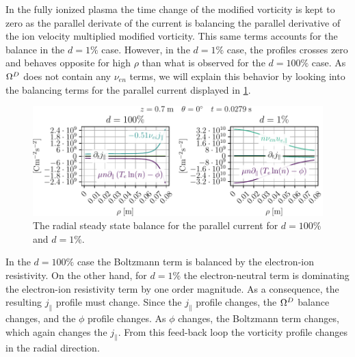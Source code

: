 %
In the fully ionized plasma the time change of the modified vorticity is kept to zero as the parallel derivate of the current is balancing the parallel derivative of the ion velocity multiplied modified vorticity.
This same terms accounts for the balance in the $d=1\%$ case.
However, in the $d=1\%$ case, the profiles crosses zero and behaves opposite for high $\rho$ than what is observed for the $d=100\%$ case.
As $\Omega^D$ does not contain any $\nu_{en}$ terms, we will explain this behavior by looking into the balancing terms for the parallel current displayed in \cref{fig:nnScanJParRad}.
%
\begin{figure}[htb]
    \centering
    \includegraphics{fig/results/neutral/jParBalanceNnCompareRad}
    \caption{The radial steady state balance for the parallel current for $d=100\%$ and $d=1\%$.}
    \label{fig:nnScanJParRad}
\end{figure}
%
In the $d=100\%$ case the Boltzmann term is balanced by the electron-ion resistivity.
On the other hand, for $d=1\%$ the electron-neutral term is dominating the electron-ion resistivity term by one order magnitude.
As a consequence, the resulting $j_\|$ profile must change.
Since the $j_\|$ profile changes, the $\Omega^D$ balance changes, and the $\phi$ profile changes.
As $\phi$ changes, the Boltzmann term changes, which again changes the $j_\|$.
From this feed-back loop the vorticity profile changes in the radial direction.

